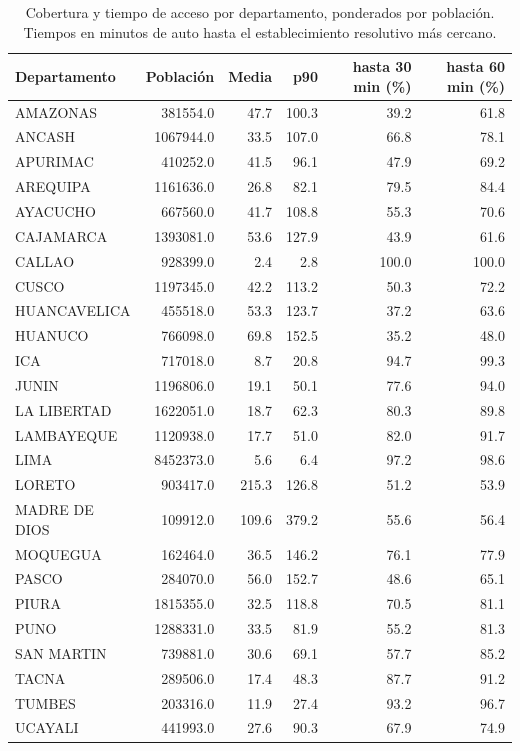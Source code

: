 \begin{table}[htbp]
\caption{Cobertura y tiempo de acceso por departamento, ponderados por población. Tiempos en minutos de auto hasta el establecimiento resolutivo más cercano.}
\label{tab:cobertura-dep}
\footnotesize
\begin{tabular}{lrrrrr}
\toprule
Departamento & Población & Media & p90 & hasta 30 min (\%) & hasta 60 min (\%) \\
\midrule
AMAZONAS & 381554.0 & 47.7 & 100.3 & 39.2 & 61.8 \\
ANCASH & 1067944.0 & 33.5 & 107.0 & 66.8 & 78.1 \\
APURIMAC & 410252.0 & 41.5 & 96.1 & 47.9 & 69.2 \\
AREQUIPA & 1161636.0 & 26.8 & 82.1 & 79.5 & 84.4 \\
AYACUCHO & 667560.0 & 41.7 & 108.8 & 55.3 & 70.6 \\
CAJAMARCA & 1393081.0 & 53.6 & 127.9 & 43.9 & 61.6 \\
CALLAO & 928399.0 & 2.4 & 2.8 & 100.0 & 100.0 \\
CUSCO & 1197345.0 & 42.2 & 113.2 & 50.3 & 72.2 \\
HUANCAVELICA & 455518.0 & 53.3 & 123.7 & 37.2 & 63.6 \\
HUANUCO & 766098.0 & 69.8 & 152.5 & 35.2 & 48.0 \\
ICA & 717018.0 & 8.7 & 20.8 & 94.7 & 99.3 \\
JUNIN & 1196806.0 & 19.1 & 50.1 & 77.6 & 94.0 \\
LA LIBERTAD & 1622051.0 & 18.7 & 62.3 & 80.3 & 89.8 \\
LAMBAYEQUE & 1120938.0 & 17.7 & 51.0 & 82.0 & 91.7 \\
LIMA & 8452373.0 & 5.6 & 6.4 & 97.2 & 98.6 \\
LORETO & 903417.0 & 215.3 & 126.8 & 51.2 & 53.9 \\
MADRE DE DIOS & 109912.0 & 109.6 & 379.2 & 55.6 & 56.4 \\
MOQUEGUA & 162464.0 & 36.5 & 146.2 & 76.1 & 77.9 \\
PASCO & 284070.0 & 56.0 & 152.7 & 48.6 & 65.1 \\
PIURA & 1815355.0 & 32.5 & 118.8 & 70.5 & 81.1 \\
PUNO & 1288331.0 & 33.5 & 81.9 & 55.2 & 81.3 \\
SAN MARTIN & 739881.0 & 30.6 & 69.1 & 57.7 & 85.2 \\
TACNA & 289506.0 & 17.4 & 48.3 & 87.7 & 91.2 \\
TUMBES & 203316.0 & 11.9 & 27.4 & 93.2 & 96.7 \\
UCAYALI & 441993.0 & 27.6 & 90.3 & 67.9 & 74.9 \\
\bottomrule
\end{tabular}
\end{table}
